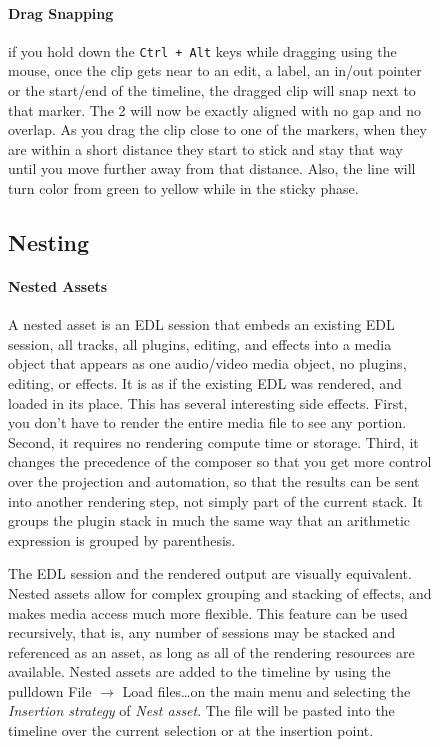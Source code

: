 \begin{figure}
\paragraph{Drag Snapping} if you hold down the \texttt{Ctrl + Alt} keys while dragging using the mouse, once the clip gets near to an edit, a label, an in/out pointer or the start/end of the timeline, the dragged clip will snap next to that marker.  The 2 will now be exactly aligned with no gap and no overlap.  As you drag the clip close to one of the markers, when they are within a short distance they start to stick and stay that way until you move further away from that distance.  Also, the line will turn color from green to yellow while in the sticky phase.

\subsection{Nesting}%
\label{sub:nesting}

\paragraph{Nested Assets} A nested asset is an EDL session that embeds an existing EDL session, all tracks, all plugins, editing, and effects into a media object that appears as one audio/video media object, no plugins, editing, or effects.  It is as if the existing EDL was rendered, and loaded in its place.  This has several interesting side effects.  First, you don’t have to render the entire media file to see any portion.  Second, it requires no rendering compute time or storage.  Third, it changes the precedence of the composer so that you get more control over the projection and automation, so that the results can be sent into another rendering step, not simply part of the current stack.  It groups the plugin stack in much the same way that an arithmetic expression is grouped by parenthesis.

The EDL session and the rendered output are visually equivalent.  Nested assets allow for complex grouping and stacking of effects, and makes media access much more flexible.  This feature can be used recursively, that is, any number of sessions may be stacked and referenced as an asset, as long as all of the rendering resources are available.  Nested assets are added to the timeline by using the pulldown File $\rightarrow$ Load files\dots on the main menu and selecting the \textit{Insertion strategy} of \textit{Nest asset}. The file will be pasted into the timeline over the current selection or at the insertion point.


\end{figure}
